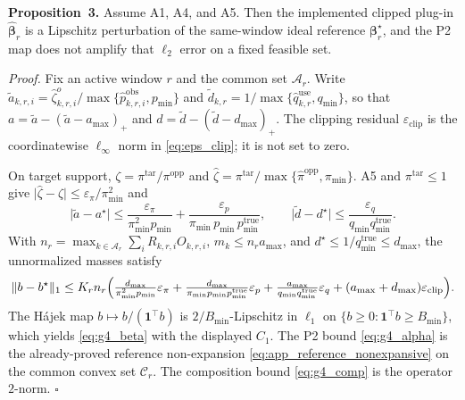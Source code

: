 \noindent\textbf{Proposition~3.}
Assume A1, A4, and A5.  Then the implemented clipped plug-in
$\widehat{\boldsymbol\beta}_r$ is a Lipschitz perturbation of the
same-window ideal reference $\boldsymbol\beta_r^\star$, and the P2 map
does not amplify that $\ell_2$ error on a fixed feasible set.

\noindent\emph{Proof.}
Fix an active window $r$ and the common set $\mathcal{A}_r$.
Write $\widetilde a_{k,r,i}=\widehat\zeta^{o}_{k,r,i}/
\max\{\widehat p^{\mathrm{obs}}_{k,r,i},p_{\min}\}$ and
$\widetilde d_{k,r}=1/\max\{\widehat q^{\mathrm{use}}_{k,r},q_{\min}\}$,
so that
$a=\widetilde a-(\widetilde a-a_{\max})_+$ and
$d=\widetilde d-(\widetilde d-d_{\max})_+$.
The clipping residual $\varepsilon_{\mathrm{clip}}$ is the
coordinatewise $\ell_{\infty}$ norm in \eqref{eq:eps_clip}; it is not set to zero.

On target support, $\zeta=\pi^{\mathrm{tar}}/\pi^{\mathrm{opp}}$ and
$\widehat\zeta=\pi^{\mathrm{tar}}/\max\{\widehat\pi^{\mathrm{opp}},
\pi_{\min}\}$.  A5 and $\pi^{\mathrm{tar}}\le1$ give
$\lvert\widehat\zeta-\zeta\rvert\le\varepsilon_\pi/\pi_{\min}^2$ and
\begin{equation}
 \bigl\lvert\widetilde a-a^\star\bigr\rvert
 \le
 \frac{\varepsilon_\pi}{\pi_{\min}^2 p_{\min}}
 +\frac{\varepsilon_p}{\pi_{\min}\,p_{\min}\,p_{\min}^{\mathrm{true}}},
 \qquad
 \bigl\lvert\widetilde d-d^\star\bigr\rvert
 \le
 \frac{\varepsilon_q}{q_{\min}q_{\min}^{\mathrm{true}}}.
 \label{eq:app_plugin_lipschitz}
\end{equation}
With $n_r=\max_{k\in\mathcal{A}_r}\sum_i R_{k,r,i}O_{k,r,i}$,
$m_k\le n_r a_{\max}$, and
$d^\star\le 1/q_{\min}^{\mathrm{true}}\le d_{\max}$,
the unnormalized masses satisfy
\begin{equation}
 \|b-b^\star\|_1
 \le
 K_r n_r
 \Bigl(
 \tfrac{d_{\max}}{\pi_{\min}^2 p_{\min}}\varepsilon_\pi
 +\tfrac{d_{\max}}{\pi_{\min}p_{\min}p_{\min}^{\mathrm{true}}}\varepsilon_p
 +\tfrac{a_{\max}}{q_{\min}q_{\min}^{\mathrm{true}}}\varepsilon_q
 +(a_{\max}+d_{\max})\varepsilon_{\mathrm{clip}}
 \Bigr).
 \label{eq:app_plugin_mass}
\end{equation}
The H\'ajek map $b\mapsto b/(\mathbf{1}^{\top}b)$ is
$2/B_{\min}$-Lipschitz in $\ell_1$ on
$\{b\ge0:\mathbf{1}^{\top}b\ge B_{\min}\}$, which yields
\eqref{eq:g4_beta} with the displayed $C_1$.
The P2 bound \eqref{eq:g4_alpha} is the already-proved reference
non-expansion \eqref{eq:app_reference_nonexpansive} on the common
convex set $\mathcal{C}_r$.  The composition bound
\eqref{eq:g4_comp} is the operator $2$-norm.
\hfill$\square$


